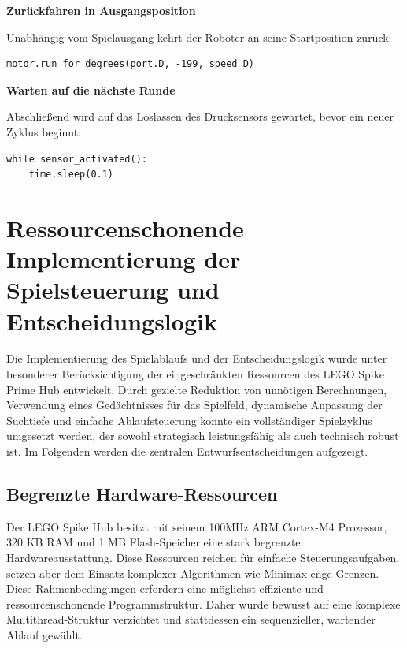 \textbf{Zurückfahren in Ausgangsposition}

Unabhängig vom Spielausgang kehrt der Roboter an seine Startposition zurück:

\begin{lstlisting}[style=pythonstyle]
	motor.run_for_degrees(port.D, -199, speed_D)
\end{lstlisting}

\textbf{Warten auf die nächste Runde}

Abschließend wird auf das Loslassen des Drucksensors gewartet, bevor ein neuer Zyklus beginnt:

\begin{lstlisting}[style=pythonstyle]
	while sensor_activated():
	time.sleep(0.1)
\end{lstlisting}



\section{Ressourcenschonende Implementierung der Spielsteuerung und Entscheidungslogik}

Die Implementierung des Spielablaufs und der Entscheidungslogik wurde unter besonderer Berücksichtigung der eingeschränkten Ressourcen des LEGO Spike Prime Hub entwickelt. Durch gezielte Reduktion von unnötigen Berechnungen, Verwendung eines Gedächtnisses für das Spielfeld, dynamische Anpassung der Suchtiefe und einfache Ablaufsteuerung konnte ein vollständiger Spielzyklus umgesetzt werden, der sowohl strategisch leistungsfähig als auch technisch robust ist. Im Folgenden werden die zentralen Entwurfsentscheidungen aufgezeigt.

\subsection{Begrenzte Hardware-Ressourcen}
Der LEGO Spike Hub besitzt mit seinem 100MHz ARM Cortex-M4 Prozessor, 320 KB RAM und 1 MB Flash-Speicher eine stark begrenzte Hardwareausstattung. Diese Ressourcen reichen für einfache Steuerungsaufgaben, setzen aber dem Einsatz komplexer Algorithmen wie Minimax enge Grenzen.
Diese Rahmenbedingungen erfordern eine möglichst effiziente und ressourcenschonende Programmstruktur. Daher wurde bewusst auf eine komplexe Multithread-Struktur verzichtet und stattdessen ein sequenzieller, wartender Ablauf gewählt.


